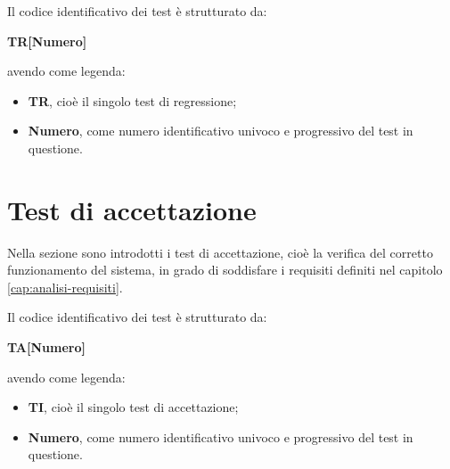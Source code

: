 Il codice identificativo dei test è strutturato da:
\begin{center}
    \textbf{TR[Numero]}
  \end{center}
\textbf{}
avendo come legenda:
\begin{itemize}
\item \textbf{TR}, cioè il singolo test di regressione;
\item \textbf{Numero}, come numero identificativo univoco e progressivo del test in questione.
\end{itemize}

\section{Test di accettazione}\label{sec:verifica-validazione-accettazione}

Nella sezione sono introdotti i test di accettazione, cioè la verifica del corretto funzionamento del sistema, in grado di soddisfare i requisiti definiti nel capitolo \ref{cap:analisi-requisiti}.

Il codice identificativo dei test è strutturato da:
\begin{center}
    \textbf{TA[Numero]}
  \end{center}
\textbf{}
avendo come legenda:
\begin{itemize}
\item \textbf{TI}, cioè il singolo test di accettazione;
\item \textbf{Numero}, come numero identificativo univoco e progressivo del test in questione.
\end{itemize}

